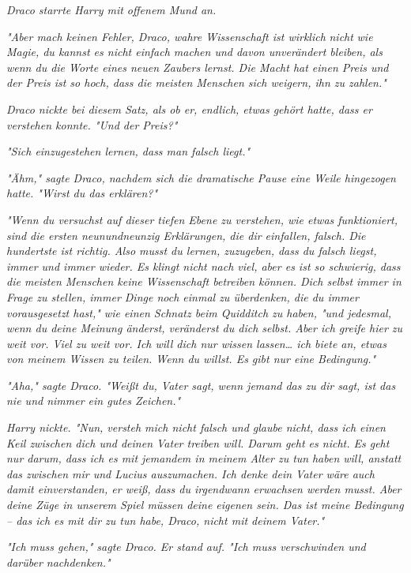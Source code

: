 {\emph{Draco starrte Harry mit offenem Mund an.}

\emph{"Aber mach keinen Fehler, Draco, wahre Wissenschaft ist wirklich} \emph{\emph{nicht}} \emph{wie Magie, du kannst es nicht einfach machen und davon unverändert bleiben, als wenn du die Worte eines neuen Zaubers lernst. Die Macht hat einen Preis und der Preis ist so hoch, dass die meisten Menschen sich weigern, ihn zu zahlen."}

\emph{Draco nickte bei diesem Satz, als ob er, endlich, etwas gehört hatte, dass er verstehen konnte. "Und der Preis?"}

\emph{"Sich einzugestehen lernen, dass man falsch liegt."}

\emph{"Ähm," sagte Draco, nachdem sich die dramatische Pause eine Weile hingezogen hatte. "Wirst du das erklären?"}

\emph{"Wenn du versuchst auf dieser tiefen Ebene zu verstehen, wie etwas funktioniert, sind die ersten neunundneunzig Erklärungen, die dir einfallen, falsch. Die hundertste ist richtig. Also musst du lernen, zuzugeben, dass du falsch liegst, immer und immer wieder. Es klingt nicht nach viel, aber es ist so schwierig, dass die meisten Menschen keine Wissenschaft betreiben können. Dich selbst immer in Frage zu stellen, immer Dinge noch einmal zu überdenken, die du immer vorausgesetzt hast," wie einen Schnatz beim Quidditch zu haben, "und jedesmal, wenn du deine Meinung änderst, veränderst du dich selbst. Aber ich greife hier zu weit vor. Viel zu weit vor. Ich will dich nur wissen lassen… ich biete an, etwas von meinem Wissen zu teilen. Wenn du willst. Es gibt nur eine Bedingung."}

\emph{"Aha," sagte Draco. "Weißt du, Vater sagt, wenn jemand das zu dir sagt, ist das nie und nimmer ein gutes Zeichen."}

\emph{Harry nickte. "Nun, versteh mich nicht falsch und glaube nicht, dass ich einen Keil zwischen dich und deinen Vater treiben will. Darum geht es nicht. Es geht nur darum, dass ich es mit jemandem in meinem Alter zu tun} \emph{haben will, anstatt das zwischen mir und Lucius auszumachen. Ich denke dein Vater wäre auch damit einverstanden, er weiß, dass du irgendwann erwachsen werden musst. Aber deine Züge in unserem Spiel müssen deine eigenen sein. Das ist meine Bedingung -- das ich es mit dir zu tun habe, Draco, nicht mit deinem Vater."}

\emph{"Ich muss gehen," sagte Draco. Er stand auf. "Ich muss verschwinden und darüber nachdenken."}

}
